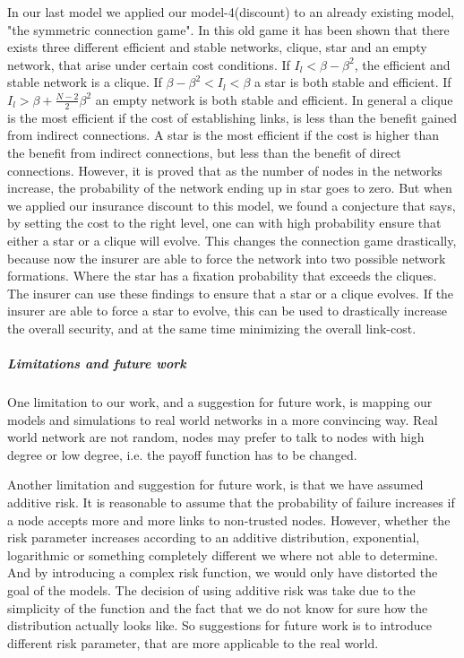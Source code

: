 In our last model we applied our model-4(discount) to an already existing model, "the symmetric connection game". In this old game it has been shown that there exists three different efficient and stable networks, clique, star and an empty network, that arise under certain cost conditions. If $I_{l}<\beta-\beta^{2}$, the efficient and stable network is a clique. If $\beta-\beta^{2}<I_{l}<\beta$ a star is both stable and efficient. If $I_{l}>\beta+\frac{N-2}{2}\beta^{2}$ an empty network is both stable and efficient. In general a clique is the most efficient if the cost of establishing links, is less than the benefit gained from indirect connections. A star is the most efficient if the cost is higher than the benefit from indirect connections, but less than the benefit of direct connections. 
However, it is proved that as the number of nodes in the networks increase, the probability of the network ending up in star goes to zero. But when we applied our insurance discount to this model, we found a conjecture that says, by setting the cost to the right level, one can with high probability ensure that either a star or a clique will evolve. This changes the connection game drastically, because now the insurer  are able to force the network into two possible network formations. Where the star has a fixation probability that exceeds the cliques. The insurer can use these findings to ensure that a star or a clique evolves. If the insurer are able to force a star to evolve, this can be used to drastically increase the overall security, and at the same time minimizing the overall link-cost. 

\subparagraph{Limitations and future work}
One limitation to our work, and a suggestion for future work, is mapping our models and simulations to real world networks in a more convincing way. Real world network are not random, nodes may prefer to talk to nodes with high degree or low degree, i.e. the payoff function has to be changed. 

Another limitation and suggestion for future work, is that we have assumed additive risk. It is reasonable to assume that the probability of failure increases if a node accepts more and more links to non-trusted nodes. However, whether the risk parameter increases according to an additive distribution, exponential, logarithmic or something completely different we where not able to determine. And by introducing a complex risk function, we would only have distorted the goal of the models. The decision of using additive risk was take due to the simplicity of the function and the fact that we do not know for sure how the distribution actually looks like.
So suggestions for future work is to introduce different risk parameter, that are more applicable to the real world.

